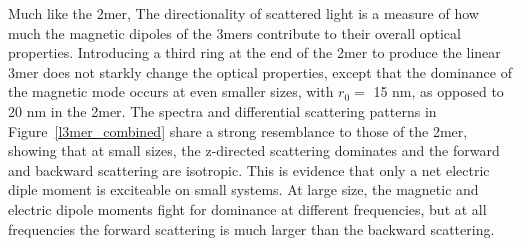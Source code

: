 \documentclass[journal=apchd5,manuscript=article]{achemso}
\begin{document}
Much like the 2mer, The directionality of scattered light is a measure of how much the magnetic dipoles of the 3mers contribute to their overall optical properties. Introducing a third ring at the end of the 2mer to produce the linear 3mer does not starkly change the optical properties, except that the dominance of the magnetic mode occurs at even smaller sizes, with $r_0=$ 15 nm, as opposed to 20 nm in the 2mer. The spectra and differential scattering patterns in Figure~\ref{l3mer_combined} share a strong resemblance to those of the 2mer, showing that at small sizes, the z-directed scattering dominates and the forward and backward scattering are isotropic. This is evidence that only a net electric diple moment is exciteable on small systems. At large size, the magnetic and electric dipole moments fight for dominance at different frequencies, but at all frequencies the forward scattering is much larger than the backward scattering.
\end{document}
